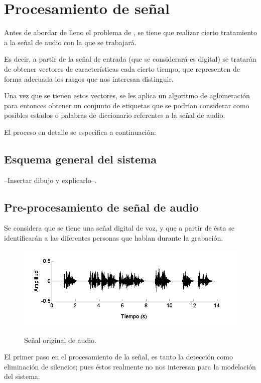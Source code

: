 \section{Procesamiento de señal}

Antes de abordar de lleno el problema de \sd, se tiene que realizar cierto tratamiento a la señal de audio con la que se trabajará. 

Es decir, a partir de la señal de entrada (que se considerará es digital) se tratarán de obtener vectores de características cada cierto tiempo, que representen de forma adecuada los rasgos que nos interesan distinguir.

Una vez que se tienen estos vectores, se les aplica un algoritmo de aglomeración para entonces obtener un conjunto de etiquetas que se podrían considerar como posibles estados o palabras de diccionario referentes a la señal de audio.

El proceso en detalle se especifica a continuación: 
\subsection{Esquema general del sistema}

--Insertar dibujo y explicarlo--.

\subsection{Pre-procesamiento de señal de audio}

Se considera que se tiene una señal digital de voz, y que a partir de ésta se identificarán a las diferentes personas que hablan durante la grabación.

\begin{figure}[bth]
  \myfloatalign
  {\includegraphics[width=0.9\linewidth]{gfx/chap5/signal-orig}} \quad
  \caption{Señal original de audio.}
  \label{fig:sign_orig}
\end{figure}

El primer paso en el procesamiento de la señal, es tanto la detección como eliminación de silencios; pues éstos realmente no nos interesan para la modelación del sistema.

